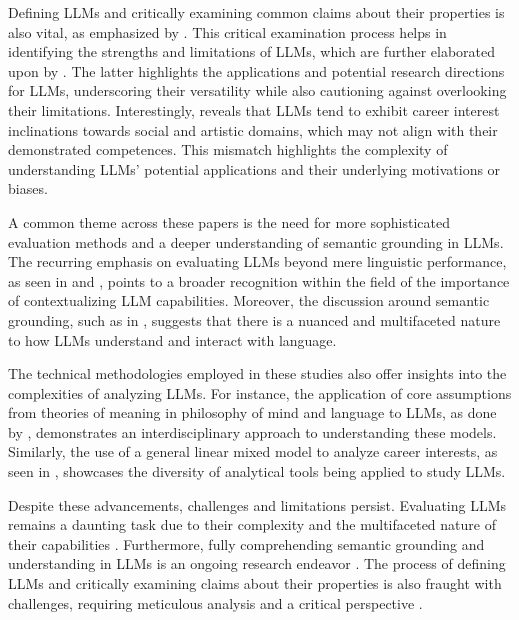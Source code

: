 \documentclass[conference]{IEEEtran}
\begin{document}
Defining LLMs and critically examining common claims about their properties is also vital, as emphasized by \cite{positionKeyClaimsInLLMResearchHaveALongTailOfFootnotes}. This critical examination process helps in identifying the strengths and limitations of LLMs, which are further elaborated upon by \cite{aPrimerOnLargeLanguageModelsAndTheirLimitations}. The latter highlights the applications and potential research directions for LLMs, underscoring their versatility while also cautioning against overlooking their limitations. Interestingly, \cite{theCareerInterestsOfLargeLanguageModels} reveals that LLMs tend to exhibit career interest inclinations towards social and artistic domains, which may not align with their demonstrated competences. This mismatch highlights the complexity of understanding LLMs' potential applications and their underlying motivations or biases.

A common theme across these papers is the need for more sophisticated evaluation methods and a deeper understanding of semantic grounding in LLMs. The recurring emphasis on evaluating LLMs beyond mere linguistic performance, as seen in \cite{aSurveyOfUsefulLLMEvaluation} and \cite{positionKeyClaimsInLLMResearchHaveALongTailOfFootnotes}, points to a broader recognition within the field of the importance of contextualizing LLM capabilities. Moreover, the discussion around semantic grounding, such as in \cite{understandingAISemanticGroundingInLargeLanguageModels}, suggests that there is a nuanced and multifaceted nature to how LLMs understand and interact with language.

The technical methodologies employed in these studies also offer insights into the complexities of analyzing LLMs. For instance, the application of core assumptions from theories of meaning in philosophy of mind and language to LLMs, as done by \cite{understandingAISemanticGroundingInLargeLanguageModels}, demonstrates an interdisciplinary approach to understanding these models. Similarly, the use of a general linear mixed model to analyze career interests, as seen in \cite{theCareerInterestsOfLargeLanguageModels}, showcases the diversity of analytical tools being applied to study LLMs.

Despite these advancements, challenges and limitations persist. Evaluating LLMs remains a daunting task due to their complexity and the multifaceted nature of their capabilities \cite{aSurveyOfUsefulLLMEvaluation}. Furthermore, fully comprehending semantic grounding and understanding in LLMs is an ongoing research endeavor \cite{understandingAISemanticGroundingInLargeLanguageModels}. The process of defining LLMs and critically examining claims about their properties is also fraught with challenges, requiring meticulous analysis and a critical perspective \cite{positionKeyClaimsInLLMResearchHaveALongTailOfFootnotes}.
\end{document}
